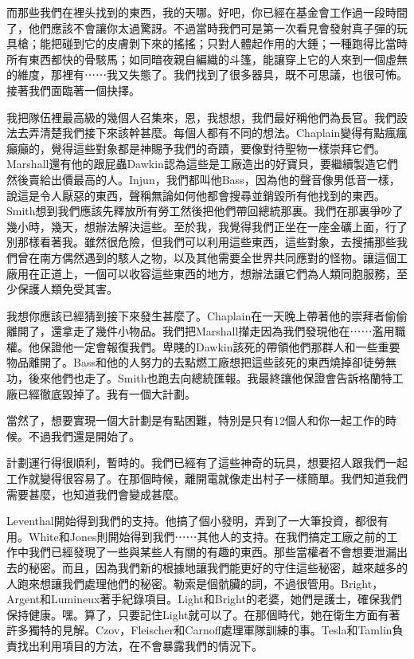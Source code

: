而那些我們在裡头找到的東西，我的天哪。好吧，你已經在基金會工作過一段時間了，他們應該不會讓你太過驚訝。不過當時我們可是第一次看見會發射真子彈的玩具槍；能把碰到它的皮膚剝下來的搖搖；只對人體起作用的大錘；一種跑得比當時所有東西都快的骨駭馬；如同暗夜親自編織的斗篷，能讓穿上它的人來到一個虛無的維度，那裡有⋯⋯我又失態了。我們找到了很多器具，既不可思議，也很可怖。接著我們面臨著一個抉擇。

我把隊伍裡最高級的幾個人召集來，恩，我想想，我們最好稱他們為長官。我們設法去弄清楚我們接下來該幹甚麼。每個人都有不同的想法。Chaplain變得有點瘋瘋癲癲的，覺得這些對象都是神賜予我們的奇蹟，要像對待聖物一樣崇拜它們。Marshall還有他的跟屁蟲Dawkin認為這些是工廠造出的好寶貝，要繼續製造它們然後賣給出價最高的人。Injun，我們都叫他Bass，因為他的聲音像男低音一樣，說這是令人厭惡的東西，聲稱無論如何他都會搜尋並銷毀所有他找到的東西。Smith想到我們應該先釋放所有勞工然後把他們帶回總統那裏。我們在那裏爭吵了幾小時，幾天，想辦法解決這些。至於我，我覺得我們正坐在一座金礦上面，行了別那樣看著我。雖然很危險，但我們可以利用這些東西，這些對象，去搜捕那些我們曾在南方偶然遇到的駭人之物，以及其他需要全世界共同應對的怪物。讓這個工廠用在正道上，一個可以收容這些東西的地方，想辦法讓它們為人類同胞服務，至少保護人類免受其害。

我想你應該已經猜到接下來發生甚麼了。Chaplain在一天晚上帶著他的崇拜者偷偷離開了，還拿走了幾件小物品。我們把Marshall攆走因為我們發現他在⋯⋯濫用職權。他保證他一定會報復我們。卑賤的Dawkin該死的帶領他們那群人和一些重要物品離開了。Bass和他的人努力的去點燃工廠想把這些該死的東西燒掉卻徒勞無功，後來他們也走了。Smith也跑去向總統匯報。我最終讓他保證會告訴格蘭特工廠已經徹底毀掉了。我有一個大計劃。

當然了，想要實現一個大計劃是有點困難，特別是只有12個人和你一起工作的時候。不過我們還是開始了。

計劃運行得很順利，暫時的。我們已經有了這些神奇的玩具，想要招人跟我們一起工作就變得很容易了。在那個時候，離開電就像走出村子一樣簡單。我們知道我們需要甚麼，也知道我們會變成甚麼。

Leventhal開始得到我們的支持。他搞了個小發明，弄到了一大筆投資，都很有用。White和Jones則開始得到我們⋯⋯其他人的支持。在我們搞定工廠之前的工作中我們已經發現了一些與某些人有關的有趣的東西。那些當權者不會想要泄漏出去的秘密。而且，因為我們新的根據地讓我們能更好的守住這些秘密，越來越多的人跑來想讓我們處理他們的秘密。勒索是個骯臟的詞，不過很管用。Bright，Argent和Lumineux著手紀錄項目。Light和Bright的老婆，她們是護士，確保我們保持健康。嘿。算了，只要記住Light就可以了。在那個時代，她在衛生方面有著許多獨特的見解。Czov，Fleischer和Carnoff處理軍隊訓練的事。Tesla和Tamlin負責找出利用項目的方法，在不會暴露我們的情況下。

